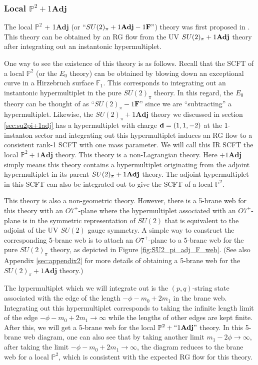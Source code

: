 \subsubsection{\texorpdfstring{Local $\mathbb{P}^2 + 1\mathbf{Adj}$}{Local P2 + 1Adj}}
The local $\mathbb{P}^2$ + 1$\mathbf{Adj}$ (or $``SU(2)_\pi+1\mathbf{Adj}-1\mathbf{F}"$) theory was first proposed in \cite{Bhardwaj:2019jtr}. This theory can be obtained by an RG flow from the UV $SU(2)_\pi+1{\bf Adj}$ theory after integrating out an instantonic hypermultiplet.

One way to see the existence of this theory is as follows. Recall that the SCFT of a local $\mathbb{P}^2$ (or the $E_0$ theory) can be obtained by blowing down an exceptional curve in a Hirzebruch surface $\mathbb{F}_1$. This corresponds to integrating out an instantonic hypermultiplet in the pure $SU(2)_\pi$ theory. In this regard, the $E_0$ theory can be thought of as ``$SU(2)_\pi-1\mathbf{F}$'' since we are ``subtracting'' a hypermultiplet. Likewise, the $SU(2)_\pi + 1\mathbf{Adj}$ theory we discussed in section \ref{sec:su2pi+1adj} has a hypermultiplet with charge ${\bf d}=(1,1,-2)$ at the 1-instanton sector and integrating out this hypermultiplet induces an RG flow to a consistent rank-1 SCFT with one mass parameter. We will call this IR SCFT  the local $\mathbb{P}^2+1\mathbf{Adj}$ theory. This theory is a non-Lagrangian theory. Here $+1\mathbf{Adj}$ simply means this theory contains a hypermultiplet originating from the adjoint hypermultiplet in its parent $SU(2)_\pi+1{\bf Adj}$ theory. The adjoint hypermultiplet in this SCFT can also be integrated out to give the SCFT of a local $\mathbb{P}^2$.

This theory is also a non-geometric theory. However, there is a 5-brane web for this theory with an $O7^+$-plane where the hypermultiplet associated with an $O7^+$-plane is in the symmetric representation of $SU(2)$ that is equivalent to the adjoint of the UV $SU(2)$ gauge symmetry. A simple way to construct the corresponding 5-brane web is to attach an $O7^+$-plane to a 5-brane web for the pure $SU(2)_\pi$ theory, as depicted in Figure \ref{fig:SU2_pi_adj_F_web}. (See also Appendix \ref{sec:appendix2} for more details of obtaining a 5-brane web for the $SU(2)_\pi + 1\mathbf{Adj}$ theory.)

The hypermultiplet which we will integrate out is the $(p,q)$-string state associated with the edge of the length $-\phi-m_0+2m_1$ in the brane web. Integrating out this hypermultiplet corresponds to taking the infinite length limit of the edge $-\phi-m_0+2m_1\rightarrow\infty$ while the lengths of other edges are kept finite. After this, we will get a 5-brane web for the local $\mathbb{P}^2+``1\mathbf{Adj}"$ theory. In this 5-brane web diagram, one can also see that by taking another limit $m_1 - 2\phi\rightarrow \infty$, after taking the limit $-\phi-m_0+2m_1\rightarrow\infty$, the diagram reduces to the brane web for a local $\mathbb{P}^2$, which is consistent with the expected RG flow for this theory.

